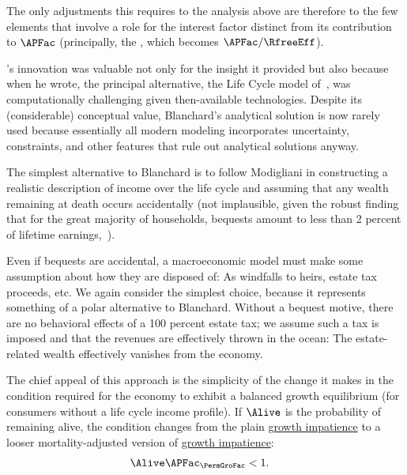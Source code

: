 \documentclass[BufferStockTheory]{subfiles}
\begin{document}
The only adjustments this requires to the analysis above are therefore to the few elements that involve a role for the interest factor distinct from its contribution to $\APFac$ (principally, the {\RIC}, which becomes $\APFac/\RfreeEff$).


\hypertarget{Modigliani-Lives}{}

\cite{blanchardFinite}'s innovation was valuable not only for the insight it provided but also because when he wrote, the principal alternative, the Life Cycle model of~\cite{modiglianiWealth}, was computationally challenging given then-available technologies.
Despite its (considerable) conceptual value, Blanchard's analytical solution is now rarely used because essentially all modern modeling incorporates uncertainty, constraints, and other features that rule out analytical solutions anyway.%

The simplest alternative to Blanchard is to follow Modigliani in constructing a realistic description of income over the life cycle and assuming that any wealth remaining at death occurs accidentally (not implausible, given the robust finding that for the great majority of households, bequests amount to less than 2 percent of lifetime earnings,~\cite{hendricksBequests,hendricksSmallBequests}).

Even if bequests are accidental, a macroeconomic model must make some assumption about how they are disposed of: As windfalls to heirs, estate tax proceeds, etc.
We again consider the simplest choice, because it represents something of a polar alternative to Blanchard.
Without a bequest motive, there are no behavioral effects of a 100 percent estate tax; we assume such a tax is imposed and that the revenues are effectively thrown in the ocean:  The estate-related wealth effectively vanishes from the economy.

The chief appeal of this approach is the simplicity of the change it makes in the condition required for the economy to exhibit a balanced growth equilibrium (for consumers without a life cycle income profile).
If $\Alive$ is the probability of remaining alive, the condition changes from the plain \hyperlink{GIC}{growth impatience} to a looser mortality-adjusted version of \hyperlink{GIC}{growth impatience}:
\hypertarget{GICLivModDefn}{}
\begin{equation}\begin{gathered}\begin{aligned}
  \Alive  \APFac_{\PermGroFac} & < 1. \label{eq:GICLivMod}
\end{aligned}\end{gathered}\end{equation}
\end{document}
